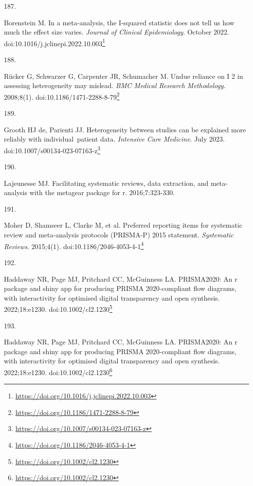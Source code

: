 \documentclass[
  a4paper,
]{book}
\newlength{\cslhangindent}
\newlength{\csllabelwidth}
\newlength{\cslentryspacingunit} %
\newenvironment{CSLReferences}[2] %
 {%
  \setlength{\parindent}{0pt}
  \ifodd #1
  \let\oldpar\par
  \def\par{\hangindent=\cslhangindent\oldpar}
  \fi
  \setlength{\parskip}{#2\cslentryspacingunit}
 }%
 {}
\newcommand{\CSLLeftMargin}[1]{\parbox[t]{\csllabelwidth}{#1}}
\newcommand{\CSLRightInline}[1]{\parbox[t]{\linewidth - \csllabelwidth}{#1}\break}
\renewcommand{\href}[2]{#2\footnote{\url{#1}}}
\begin{document}
\begin{CSLReferences}{0}{0}
\leavevmode{}%
\CSLLeftMargin{187. }%
\CSLRightInline{Borenstein M. In a meta-analysis, the I-squared statistic does not tell us how much the effect size varies. \emph{Journal of Clinical Epidemiology}. October 2022. doi:\href{https://doi.org/10.1016/j.jclinepi.2022.10.003}{10.1016/j.jclinepi.2022.10.003}}

\leavevmode{}%
\CSLLeftMargin{188. }%
\CSLRightInline{Rücker G, Schwarzer G, Carpenter JR, Schumacher M. Undue reliance on I 2 in assessing heterogeneity may mislead. \emph{BMC Medical Research Methodology}. 2008;8(1). doi:\href{https://doi.org/10.1186/1471-2288-8-79}{10.1186/1471-2288-8-79}}

\leavevmode{}%
\CSLLeftMargin{189. }%
\CSLRightInline{Grooth HJ de, Parienti JJ. Heterogeneity between studies can be explained more reliably with individual~patient data. \emph{Intensive Care Medicine}. July 2023. doi:\href{https://doi.org/10.1007/s00134-023-07163-z}{10.1007/s00134-023-07163-z}}

\leavevmode{}%
\CSLLeftMargin{190. }%
\CSLRightInline{Lajeunesse MJ. Facilitating systematic reviews, data extraction, and meta-analysis with the metagear package for r. 2016;7:323-330.}

\leavevmode{}%
\CSLLeftMargin{191. }%
\CSLRightInline{Moher D, Shamseer L, Clarke M, et al. Preferred reporting items for systematic review and meta-analysis protocols (PRISMA-P) 2015 statement. \emph{Systematic Reviews}. 2015;4(1). doi:\href{https://doi.org/10.1186/2046-4053-4-1}{10.1186/2046-4053-4-1}}

\leavevmode{}%
\CSLLeftMargin{192. }%
\CSLRightInline{Haddaway NR, Page MJ, Pritchard CC, McGuinness LA. PRISMA2020: An r package and shiny app for producing PRISMA 2020-compliant flow diagrams, with interactivity for optimised digital transparency and open synthesis. 2022;18:e1230. doi:\href{https://doi.org/10.1002/cl2.1230}{10.1002/cl2.1230}}

\leavevmode{}%
\CSLLeftMargin{193. }%
\CSLRightInline{Haddaway NR, Page MJ, Pritchard CC, McGuinness LA. PRISMA2020: An r package and shiny app for producing PRISMA 2020-compliant flow diagrams, with interactivity for optimised digital transparency and open synthesis. 2022;18:e1230. doi:\href{https://doi.org/10.1002/cl2.1230}{10.1002/cl2.1230}}


\end{CSLReferences}
\end{document}
